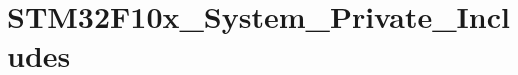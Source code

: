 \hypertarget{group___s_t_m32_f10x___system___private___includes}{\section{S\-T\-M32\-F10x\-\_\-\-System\-\_\-\-Private\-\_\-\-Includes}
\label{group___s_t_m32_f10x___system___private___includes}
}
